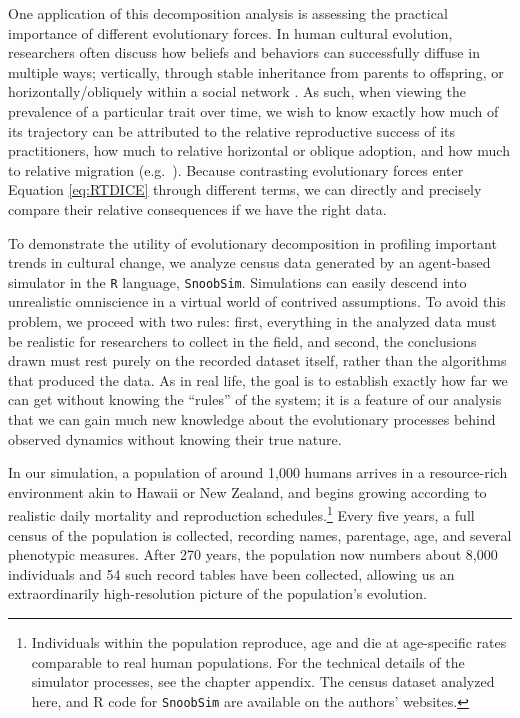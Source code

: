 One application of this decomposition analysis is assessing the practical importance of different evolutionary forces. In human cultural evolution, researchers often discuss how beliefs and behaviors can successfully diffuse in multiple ways; vertically, through stable inheritance from parents to offspring, or horizontally/obliquely within a social network \citep{Richerson2005:NBGA}.  As such, when viewing the prevalence of a particular trait over time, we wish to know exactly how much of its trajectory can be attributed to the relative reproductive success of its practitioners, how much to relative horizontal or oblique adoption, and how much to relative migration (e.g.~\citealp{stark1996rise, hout2001demographic}).  Because contrasting evolutionary forces enter Equation \ref{eq:RTDICE} through different terms, we can directly and precisely compare their relative consequences if we have the right data.  

To demonstrate the utility of evolutionary decomposition in profiling important trends in cultural change, we analyze census data generated by an agent-based simulator in the \texttt{R} language, \texttt{SnoobSim}.  Simulations can easily descend into unrealistic omniscience in a virtual world of contrived assumptions.  To avoid this problem, we proceed with two rules: first, everything in the analyzed data must be realistic for researchers to collect in the field, and second, the conclusions drawn must rest purely on the recorded dataset itself, rather than the algorithms that produced the data.  As in real life, the goal is to establish exactly how far we can get without knowing the ``rules'' of the system; it is a feature of our analysis that we can gain much new knowledge about the evolutionary processes behind observed dynamics without knowing their true nature.  

In our simulation, a population of around 1,000 humans arrives in a resource-rich environment akin to Hawaii or New Zealand, and begins growing according to realistic daily mortality and reproduction schedules.\footnote{Individuals within the population reproduce, age and die at age-specific rates comparable to real human populations.  For the technical details of the simulator processes, see the chapter appendix.  The census dataset analyzed here, and R code for \texttt{SnoobSim} are available on the authors' websites.}  Every five years, a full census of the population is collected, recording names, parentage, age, and several phenotypic measures.  After 270 years, the population now numbers about 8,000 individuals and 54 such record tables have been collected, allowing us an extraordinarily high-resolution picture of the population's evolution.

